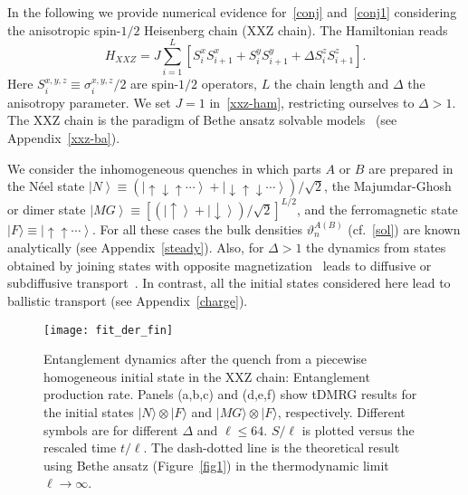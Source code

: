 \documentclass[twocolumn,superscriptaddress,prb,10pt]{revtex4-1}
\begin{document}
In the following we provide numerical evidence for~\eqref{conj} and~\eqref{conj1} considering 
the anisotropic spin-$1/2$ Heisenberg chain (XXZ chain). The Hamiltonian reads 
%
\begin{equation}
\label{xxz-ham}
H_{XXZ}=J\sum_{i=1}^L[S_i^xS_{i+1}^x+S_i^yS_{i+1}^y+\Delta S_i^zS_{i+1}^z]. 
\end{equation}
%
Here $S_i^{x,y,z}\equiv\sigma_i^{x,y,z}/2$ are spin-$1/2$ operators, 
$L$ the chain length and $\Delta$ the anisotropy parameter. We set $J=1$ 
in~\eqref{xxz-ham}, restricting ourselves to $\Delta>1$. 
The XXZ chain is the paradigm of Bethe ansatz solvable models~\cite{taka-book} (see 
Appendix~\ref{xxz-ba}). 

We consider the inhomogeneous quenches in which parts $A$ or $B$ are 
prepared in the N\'eel state $\left|N\right\rangle
\equiv(\left|\uparrow\downarrow\uparrow\cdots\right\rangle+\left|
\downarrow\uparrow\downarrow\cdots\right\rangle)/\sqrt{2}$, the Majumdar-Ghosh 
or dimer state $\left|MG\right\rangle\equiv[(\left|\uparrow\right\rangle+
\left|\downarrow\right\rangle)/\sqrt{2}]^{L/2}$, and the ferromagnetic 
state $|F\rangle\equiv\left|\uparrow\uparrow\cdots\right\rangle$. 
For all these cases the bulk densities $\vartheta_{n}^{\scriptscriptstyle 
A(B)}$ (cf.~\eqref{sol}) are known analytically (see Appendix~\ref{steady}). 
Also, for $\Delta>1$ the dynamics from states obtained by joining states with 
opposite magnetization~\cite{piroli-2017a} leads to diffusive or subdiffusive 
transport~\cite{ljubotina-2017,misguich-2017,stephan-2017}. In contrast, all the initial states 
considered here lead to ballistic transport (see Appendix~\ref{charge}). 

\begin{figure}[t]
\texttt{[image: fit\_der\_fin]}
\caption{ Entanglement dynamics after the quench from a piecewise homogeneous 
 initial state in 
 the XXZ chain: Entanglement production rate. Panels 
 (a,b,c) and (d,e,f) show tDMRG results for the initial states $|N\rangle
 \otimes|F\rangle$ and $|MG\rangle\otimes|F\rangle$, respectively. 
 Different symbols are for different $\Delta$ and $\ell\le 64$. 
 $S/\ell$ is plotted versus the rescaled time $t/\ell$. The dash-dotted 
 line is the theoretical result using Bethe ansatz (Figure~\ref{fig1}) 
 in the thermodynamic limit $\ell\to\infty$. 
}
\label{fig3}
\end{figure}
\end{document}
